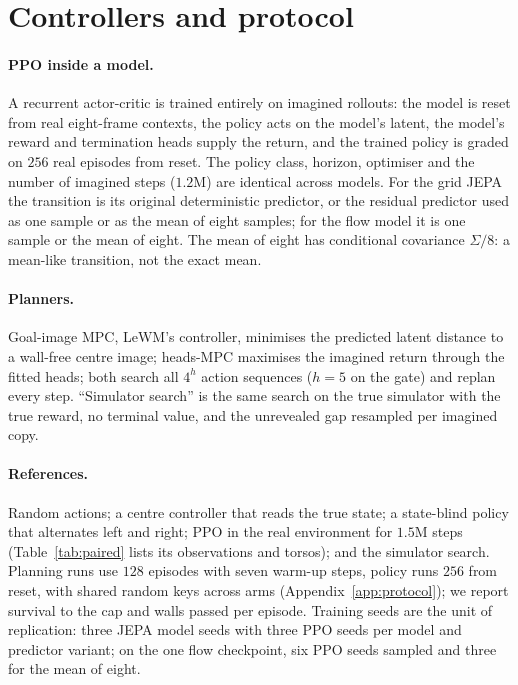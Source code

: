 \section{Controllers and protocol}
\label{sec:controllers}

\paragraph{PPO inside a model.} A recurrent actor-critic \citep{schulman2017ppo,espeholt2018impala,
farebrother2024stopregressing} is trained entirely on imagined rollouts: the model is reset from real
eight-frame contexts, the policy acts on the model's latent, the model's reward and termination heads
supply the return, and the trained policy is graded on $256$ real episodes from reset. The policy
class, horizon, optimiser and the number of imagined steps ($1.2$M) are identical across models. For
the grid JEPA the transition is its original deterministic predictor, or the residual predictor used as
one sample or as the mean of eight samples; for the flow model it is one sample or the mean of eight.
The mean of eight has conditional covariance $\Sigma/8$: a mean-like transition, not the exact mean.

\paragraph{Planners.} Goal-image MPC, LeWM's controller, minimises the predicted latent distance to a
wall-free centre image; heads-MPC maximises the imagined return through the fitted heads; both search
all $4^h$ action sequences ($h=5$ on the gate) and replan every step. ``Simulator search'' is the same
search on the true simulator with the true reward, no terminal value, and the unrevealed gap resampled per imagined copy.

\paragraph{References.} Random actions; a centre controller that reads the true state; a state-blind
policy that alternates left and right; PPO in the real environment for $1.5$M steps (Table~\ref{tab:paired} lists its observations and torsos); and the simulator search. Planning runs use $128$ episodes with seven warm-up steps, policy runs $256$ from reset, with shared random keys across arms (Appendix~\ref{app:protocol}); we report survival to the cap and walls passed per episode. Training seeds are the unit of replication: three JEPA model seeds with three PPO seeds per model and predictor variant; on the one flow checkpoint, six PPO seeds sampled and three for the mean of eight.
